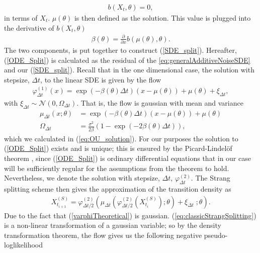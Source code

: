 \begin{align}
     b(X_t, \theta) = 0,
\end{align}
in terms of $X_t$. $\mu\left(\theta\right)$ is then defined as the solution. This value is plugged into the derivative of $b(X_t, \theta)$ 
\begin{align}
    \beta\left(\theta\right) = \frac{\partial}{\partial x} b(\mu\left(\theta\right), \theta).
\end{align}
The two components, is put together to construct (\ref{SDE_split}).
Hereafter, (\ref{ODE_Split}) is calculated as the residual of the \ref{eq:generalAdditiveNoiseSDE} and our (\ref{SDE_split}). Recall that in the one dimensional case, the solution with stepsize, $\Delta t$, to the linear SDE is given by the flow
\begin{align}
    \varphi_{\Delta t}^{(1)}(x) = \exp\left(-\beta\left(\theta\right) \Delta t\right)\left(x - \mu\left(\theta\right)\right) + \mu\left(\theta\right) + \xi_{\Delta t}, \label{varphiTheoretical}
\end{align}
with $\xi_{\Delta t}\sim\mathcal{N}\left(0, \Omega_{\Delta t}\right)$. That is, the flow is gaussian with mean and variance
\begin{align}
    \mu_{\Delta t}(x; \theta) &= \exp\left(-\beta\left(\theta\right) \Delta t\right)\left(x - \mu\left(\theta\right)\right) + \mu\left(\theta\right) \label{linearSDEMean}\\
    \Omega_{\Delta t} &= \frac{\sigma^2}{2\beta}\left(1 - \exp\left(-2\beta\left(\theta\right)\Delta t\right)\right), \label{linearSDEVariance}
\end{align}
which we calculated in (\ref{eq:OU_solution}). For our purposes the solution to (\ref{ODE_Split}) exists and is unique; this is ensured by the Picard-Lindelöf theorem \cite[section 2.7]{Srkk2019}, since (\ref{ODE_Split}) is ordinary differential equations that in our case will be sufficiently regular for the assumptions from the theorem to hold.
Nevertheless, we denote the solution with stepsize, $\Delta t$, $\varphi_{\Delta t}^{(2)}$. The Strang splitting scheme then gives the approximation of the transition density as 
\begin{align}
    X_{t_{i+1}}^{(S)} = \varphi_{\Delta t / 2}^{(2)}\left(\mu_{\Delta t}\left(\varphi_{\Delta t/2}^{(2)}\left(X_{t_{i}}^{(S)}\right); \theta\right) + \xi_{\Delta t} \; ; \theta \right). \label{eq:classicStrangSplitting}
\end{align}
Due to the fact that (\ref{varphiTheoretical}) is gaussian. (\ref{eq:classicStrangSplitting}) is a non-linear transformation of a gaussian variable; so by the density transformation theorem, the flow gives us the following negative pseudo-loglikelihood 
